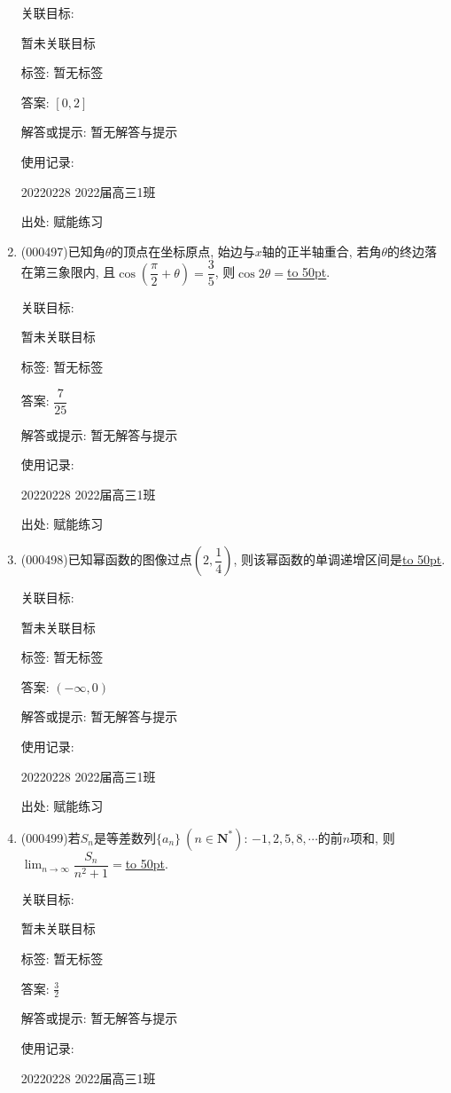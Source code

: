 \documentclass[10pt,a4paper]{article}
\newcommand{\blank}[1]{\underline{\hbox to #1pt{}}}
\begin{document}
\begin{enumerate}[1.]
关联目标:

暂未关联目标



标签: 暂无标签

答案: $[0,2]$

解答或提示: 暂无解答与提示

使用记录:

20220228	2022届高三1班	


出处: 赋能练习
\item { (000497)}已知角$\theta$的顶点在坐标原点, 始边与$x$轴的正半轴重合, 若角$\theta$的终边落在第三象限内, 且$\cos(\dfrac\pi 2+\theta)=\dfrac35$, 则$\cos 2\theta=$\blank{50}.


关联目标:

暂未关联目标



标签: 暂无标签

答案: $\dfrac 7{25}$

解答或提示: 暂无解答与提示

使用记录:

20220228	2022届高三1班	


出处: 赋能练习
\item { (000498)}已知幂函数的图像过点$(2,\dfrac14)$, 则该幂函数的单调递增区间是\blank{50}.


关联目标:

暂未关联目标



标签: 暂无标签

答案: $(-\infty ,0)$

解答或提示: 暂无解答与提示

使用记录:

20220228	2022届高三1班	


出处: 赋能练习
\item { (000499)}若$S_n$是等差数列$\{a_n\}\ (n\in \mathbf{N}^*)$: $-1,2,5,8,\cdots$的前$n$项和, 则$\displaystyle\lim_{n\to\infty}\dfrac{{S_n}}{{n^2}+1}=$\blank{50}.


关联目标:

暂未关联目标



标签: 暂无标签

答案: $\frac 32$

解答或提示: 暂无解答与提示

使用记录:

20220228	2022届高三1班	



\end{enumerate}
\end{document}
